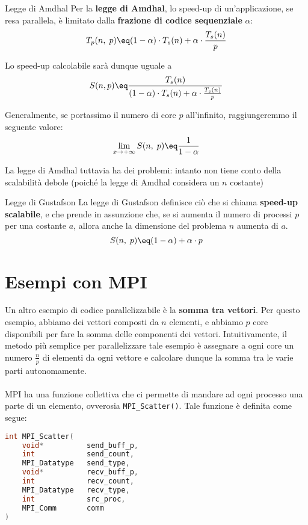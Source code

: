 \begin{definition}{Legge di Amdhal}
    Per la \textbf{legge di Amdhal}, lo speed-up di un'applicazione, se resa parallela, è limitato dalla \textbf{frazione di codice sequenziale} $\alpha$:
    \[ T_p(n, \; p) \eq (1 - \alpha) \cdot T_s(n) + \alpha \cdot \frac{T_s(n)}{p} \]

    Lo speed-up calcolabile sarà dunque uguale a
    \[ S(n, p) \eq \frac{T_s(n)}{(1 - \alpha) \cdot T_s(n) + \alpha \cdot \frac{T_s(n)}{p}} \]
\end{definition}

Generalmente, se portassimo il numero di core $p$ all'infinito, raggiungeremmo il seguente valore:
\[ \lim_{x \to +\infty} S(n, \; p) \eq \frac{1}{1 - \alpha} \]

\noindent La legge di Amdhal tuttavia ha dei problemi: intanto non tiene conto della scalabilità debole (poiché la legge di Amdhal considera un $n$ costante) %

\begin{definition}{Legge di Gustafson}
    La legge di Gustafson definisce ciò che si chiama \textbf{speed-up scalabile}, e che prende in assunzione che, se si aumenta il numero di processi $p$ per una costante $a$, allora anche la dimensione del problema $n$ aumenta di $a$.
    \[ S(n, \; p) \eq (1 - \alpha) + \alpha \cdot p \]
\end{definition}

\section{Esempi con MPI}


Un altro esempio di codice parallelizzabile è la \textbf{somma tra vettori}. Per questo esempio, abbiamo dei vettori composti da $n$ elementi, e abbiamo $p$ core disponibili per fare la somma delle componenti dei vettori. Intuitivamente, il metodo più semplice per parallelizzare tale esempio è assegnare a ogni core un numero $\frac{n}{p}$ di elementi da ogni vettore e calcolare dunque la somma tra le varie parti autonomamente.
\\\\
MPI ha una funzione collettiva che ci permette di mandare ad ogni processo una parte di un elemento, ovverosia \verb|MPI_Scatter()|. Tale funzione è definita come segue:

\begin{lstlisting}[language = C, numbers = none]
int MPI_Scatter(
    void*          send_buff_p,
    int            send_count,
    MPI_Datatype   send_type,
    void*          recv_buff_p,
    int            recv_count,
    MPI_Datatype   recv_type,
    int            src_proc,
    MPI_Comm       comm
)\end{lstlisting}

